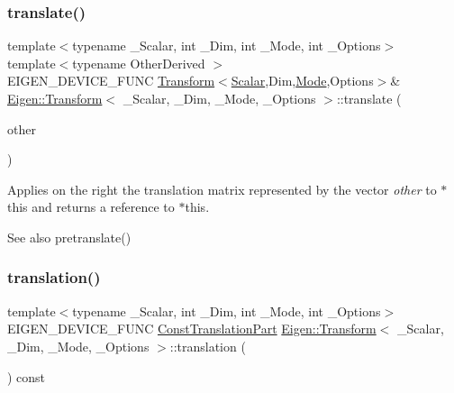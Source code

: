\subsubsection{\texorpdfstring{translate()}{translate()}}
{\footnotesize\ttfamily template$<$typename \+\_\+\+Scalar, int \+\_\+\+Dim, int \+\_\+\+Mode, int \+\_\+\+Options$>$ \\
template$<$typename Other\+Derived $>$ \\
E\+I\+G\+E\+N\+\_\+\+D\+E\+V\+I\+C\+E\+\_\+\+F\+U\+NC \mbox{\hyperlink{class_eigen_1_1_transform}{Transform}}$<$\mbox{\hyperlink{class_eigen_1_1_transform_a4e69ced9d651745b8ed4eda46f41795d}{Scalar}},Dim,\mbox{\hyperlink{struct_mode}{Mode}},Options$>$\& \mbox{\hyperlink{class_eigen_1_1_transform}{Eigen\+::\+Transform}}$<$ \+\_\+\+Scalar, \+\_\+\+Dim, \+\_\+\+Mode, \+\_\+\+Options $>$\+::translate (\begin{DoxyParamCaption}\item[{const \mbox{\hyperlink{class_eigen_1_1_matrix_base}{Matrix\+Base}}$<$ Other\+Derived $>$ \&}]{other }\end{DoxyParamCaption})}

Applies on the right the translation matrix represented by the vector {\itshape other} to {\ttfamily $\ast$this} and returns a reference to {\ttfamily $\ast$this}. \begin{DoxySeeAlso}{See also}
pretranslate() 
\end{DoxySeeAlso}
\mbox{\label{class_eigen_1_1_transform_afa93ba97d26912bb3d8777cbed102045}} 
\subsubsection{\texorpdfstring{translation()}{translation()}\hspace{0.1cm}{\footnotesize\ttfamily [1/2]}}
{\footnotesize\ttfamily template$<$typename \+\_\+\+Scalar, int \+\_\+\+Dim, int \+\_\+\+Mode, int \+\_\+\+Options$>$ \\
E\+I\+G\+E\+N\+\_\+\+D\+E\+V\+I\+C\+E\+\_\+\+F\+U\+NC \mbox{\hyperlink{class_eigen_1_1_transform_a3eab3259d3fac8106eb3139bc96ba852}{Const\+Translation\+Part}} \mbox{\hyperlink{class_eigen_1_1_transform}{Eigen\+::\+Transform}}$<$ \+\_\+\+Scalar, \+\_\+\+Dim, \+\_\+\+Mode, \+\_\+\+Options $>$\+::translation (\begin{DoxyParamCaption}{ }\end{DoxyParamCaption}) const\hspace{0.3cm}{\ttfamily [inline]}}


